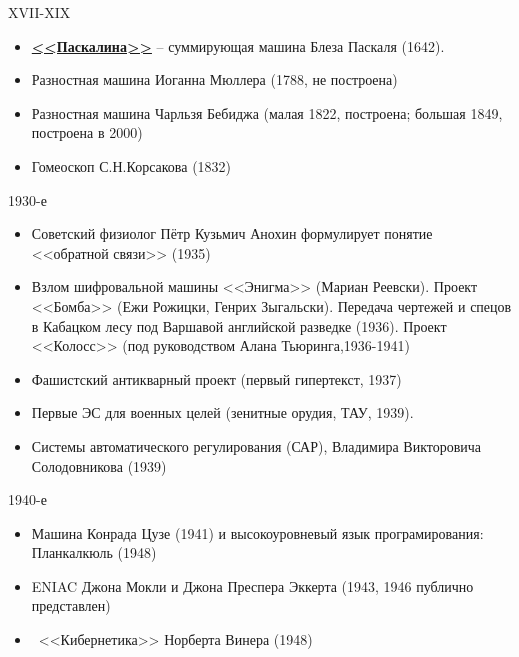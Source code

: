   \begin{frame}{XVII-XIX}
     \begin{itemize}
        \item \textbf{
         \href{https://ru.wikipedia.org/wiki/\%D0\%A1\%D1\%83\%D0\%BC\%D0\%BC\%D0\%B8\%D1\%80\%D1\%83\%D1\%8E\%D1\%89\%D0\%B0\%D1\%8F_\%D0\%BC\%D0\%B0\%D1\%88\%D0\%B8\%D0\%BD\%D0\%B0_\%D0\%9F\%D0\%B0\%D1\%81\%D0\%BA\%D0\%B0\%D0\%BB\%D1\%8F}{<<Паскалина>>}}  -- суммирующая машина Блеза Паскаля (1642).
        \item Разностная машина Иоганна Мюллера (1788, не построена)
        \item Разностная машина Чарльзя Бебиджа (малая 1822, построена; большая 1849, построена в 2000)
        \item Гомеоскоп С.Н.Корсакова (1832) 
     \end{itemize}
  \end{frame}
 
   \begin{frame}{1930-е}
     \begin{itemize}
     	\item Советский физиолог 
     	Пётр Кузьмич Анохин
     	формулирует понятие <<обратной связи>> (1935)
 	    \item Взлом шифровальной машины <<Энигма>> (Мариан Реевски).
 	    Проект <<Бомба>> (Ежи Рожицки, Генрих Зыгальски).
 	    Передача чертежей и спецов в Кабацком лесу под Варшавой 
 	    английской разведке (1936).
 	    Проект <<Колосс>> (под руководством Алана Тьюринга,1936-1941)
 	    \item Фашистский антикварный проект (первый гипертекст, 1937)
 	    \item Первые ЭС для военных целей (зенитные орудия, ТАУ, 1939).
 	    \item Системы автоматического регулирования (САР),
 	    Владимира Викторовича Солодовникова (1939)
      \end{itemize}
   \end{frame}

     \begin{frame}{1940-е}
   \begin{itemize}
   	\item Машина Конрада Цузе (1941) 
   	и высокоуровневый язык програмирования: Планкалкюль (1948)
   	\item ENIAC Джона Мокли
   	и
   	Джона Преспера Эккерта
   	(1943, 1946 публично представлен)
   	\item ~<<Кибернетика>>
   	Норберта Винера (1948)
   \end{itemize}
\end{frame}

